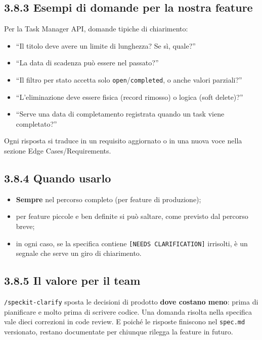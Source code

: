 \documentclass[
  italian,
  10pt,
]{book}
\providecommand{\tightlist}{%
  \setlength{\itemsep}{0pt}\setlength{\parskip}{0pt}}
\begin{document}
\subsection{3.8.3 Esempi di domande per la nostra
feature}\label{esempi-di-domande-per-la-nostra-feature}

Per la Task Manager API, domande tipiche di chiarimento:

\begin{itemize}
\tightlist
\item
  ``Il titolo deve avere un limite di lunghezza? Se sì, quale?''
\item
  ``La data di scadenza può essere nel passato?''
\item
  ``Il filtro per stato accetta solo \texttt{open}/\texttt{completed}, o
  anche valori parziali?''
\item
  ``L'eliminazione deve essere fisica (record rimosso) o logica (soft
  delete)?''
\item
  ``Serve una data di completamento registrata quando un task viene
  completato?''
\end{itemize}

Ogni risposta si traduce in un requisito aggiornato o in una nuova voce
nella sezione Edge Cases/Requirements.

\subsection{3.8.4 Quando usarlo}\label{quando-usarlo}

\begin{itemize}
\tightlist
\item
  \textbf{Sempre} nel percorso completo (per feature di produzione);
\item
  per feature piccole e ben definite si può saltare, come previsto dal
  percorso breve;
\item
  in ogni caso, se la specifica contiene
  \texttt{{[}NEEDS\ CLARIFICATION{]}} irrisolti, è un segnale che serve
  un giro di chiarimento.
\end{itemize}

\subsection{3.8.5 Il valore per il team}\label{il-valore-per-il-team}

\texttt{/speckit-clarify} sposta le decisioni di prodotto \textbf{dove
costano meno}: prima di pianificare e molto prima di scrivere codice.
Una domanda risolta nella specifica vale dieci correzioni in code
review. E poiché le risposte finiscono nel \texttt{spec.md} versionato,
restano documentate per chiunque rilegga la feature in futuro.
\end{document}
